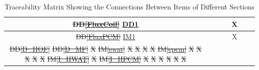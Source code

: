 \documentclass[12pt]{article}
\makeatletter
\newcommand{\ddref}[1]{DD\ref{#1}}
\newcommand{\iref}[1]{IM\ref{#1}}
\providecommand{\DIFdeltex}[1]{{\protect\color{red}\sout{#1}}} %
\providecommand{\DIFdelFL}[1]{\DIFdel{#1}} %
\providecommand{\DIFaddbeginFL}{} %
\providecommand{\DIFaddendFL}{} %
\providecommand{\DIFdelbeginFL}{} %
\providecommand{\DIFdelendFL}{} %
\providecommand{\DIFdel}[1]{\texorpdfstring{\DIFdeltex{#1}}{}} %
\newcommand{\DIFscaledelfig}{0.5}
\newlength{\DIFdelgraphicswidth} %
\newlength{\DIFdelgraphicsheight} %
\newcommand{\DIFaddincludegraphics}[2][]{{\color{blue}\fbox{\DIFOincludegraphics[#1]{#2}}}} %
\newcommand{\DIFdelincludegraphics}[2][]{%
\sbox{\DIFdelgraphicsbox}{\DIFOincludegraphics[#1]{#2}}%
\settoboxwidth{\DIFdelgraphicswidth}{\DIFdelgraphicsbox} %
\settoboxtotalheight{\DIFdelgraphicsheight}{\DIFdelgraphicsbox} %
\scalebox{\DIFscaledelfig}{%
\parbox[b]{\DIFdelgraphicswidth}{\usebox{\DIFdelgraphicsbox}\\[-\baselineskip] \rule{\DIFdelgraphicswidth}{0em}}\llap{\resizebox{\DIFdelgraphicswidth}{\DIFdelgraphicsheight}{%
\setlength{\unitlength}{\DIFdelgraphicswidth}%
\begin{picture}(1,1)%
\thicklines\linethickness{2pt} %
{\color[rgb]{1,0,0}\put(0,0){\framebox(1,1){}}}%
{\color[rgb]{1,0,0}\put(0,0){\line( 1,1){1}}}%
{\color[rgb]{1,0,0}\put(0,1){\line(1,-1){1}}}%
\end{picture}%
}\hspace*{3pt}}} %
} %
\DeclareRobustCommand{\DIFaddbeginFL}{\DIFOaddbeginFL \let\includegraphics\DIFaddincludegraphics} %
\DeclareRobustCommand{\DIFaddendFL}{\DIFOaddendFL \let\includegraphics\DIFOincludegraphics} %
\DeclareRobustCommand{\DIFdelbeginFL}{\DIFOdelbeginFL \let\includegraphics\DIFdelincludegraphics} %
\DeclareRobustCommand{\DIFdelendFL}{\DIFOaddendFL \let\includegraphics\DIFOincludegraphics} %
\let\sout@orig\sout %
\renewcommand{\sout}[1]{\ifmmode\text{\sout@orig{\ensuremath{#1}}}\else\sout@orig{#1}\fi} %
\makeatother
\begin{document}
\begin{table}[h!]
\begin{tabular}{|c|c|c|c|c|c|c|}
\DIFdelendFL \\ \hline
  \DIFdelbeginFL \DIFdelFL{\ddref{FluxCoil} }\DIFdelendFL \DIFaddbeginFL \hyperref[DD_EndEffectorPosition]{DD1}   \DIFaddendFL & & & & X & & \DIFdelbeginFL %
\DIFdelendFL \\ \hline
  \DIFdelbeginFL \DIFdelFL{\ddref{FluxPCM}  }\DIFdelendFL \DIFaddbeginFL \hyperref[IM:ArmPathPlanning]{IM1}       \DIFaddendFL & & & & X & & \DIFdelbeginFL %
\DIFdelendFL \\ \hline
  \DIFdelbeginFL \DIFdelFL{\ddref{D_HOF}    }%
\DIFdelFL{\ddref{D_MF}     }%
\DIFdelFL{X}%
\DIFdelFL{\iref{ewat}      }%
\DIFdelFL{X}%
\DIFdelFL{X}%
\DIFdelFL{X}%
\DIFdelFL{X}%
\DIFdelFL{\iref{epcm}      }%
\DIFdelFL{X}%
\DIFdelFL{X}%
\DIFdelFL{X}%
\DIFdelFL{X}%
\DIFdelFL{X }%
\DIFdelFL{\iref{I_HWAT}    }%
\DIFdelFL{X}%
\DIFdelFL{\iref{I_HPCM}    }%
\DIFdelFL{X}%
\DIFdelFL{X}%
\DIFdelFL{X}%
\DIFdelFL{X}%
\DIFdelFL{X}%
\DIFdelFL{X}%
\DIFdelendFL \end{tabular}
  \caption{Traceability Matrix Showing the Connections Between Items of Different Sections}
  \label{Table:trace}
\end{table}
\end{document}
